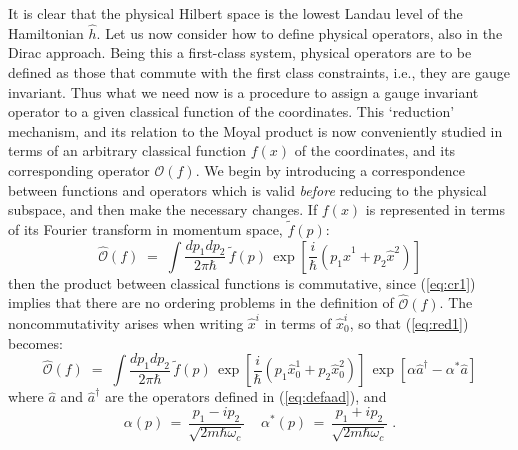 \documentclass[a4paper,12pt]{article}
\begin{document}
It is clear that the physical Hilbert space is the lowest Landau
level
of the Hamiltonian ${\hat h}$. Let us now consider how to define
physical operators, also in the Dirac approach. Being this a
first-class system, physical operators are to be defined as those
that
commute with the first class constraints, i.e., they are gauge
invariant. Thus what we need now is a procedure to assign a gauge
invariant operator to a given classical function of the
coordinates.
This `reduction' mechanism, and its relation to the Moyal product
is
now conveniently studied in terms of an arbitrary classical
function
$f(x)$ of the coordinates, and its corresponding operator
${\mathcal
  O}(f)$.  We begin by introducing a correspondence between
functions
and operators which is valid {\em before\/} reducing to the
physical
subspace, and then make the necessary changes. If $f(x)$ is
represented in terms of its Fourier transform in momentum space,
${\tilde f}(p)$:
\begin{equation}
  \label{eq:red1}
{\hat {\mathcal O}}(f)\;=\; \int \frac{dp_1 dp_2}{2\pi \hbar}\,
{\tilde f}(p) \, \exp [ \frac{i}{\hbar} (p_1 {\hat x}^1 + p_2 {\hat
x}^2)]
\end{equation}
then the product between classical functions is commutative, since
(\ref{eq:cr1}) implies that there are no ordering problems in the
definition of ${\hat{\mathcal O}}(f)$.  The noncommutativity arises
when writing ${\hat x}^i$ in terms of ${\hat x}^i_0$, so that
(\ref{eq:red1}) becomes:
\begin{equation}
  \label{eq:red2}
{\hat {\mathcal O}}(f)\;=\; \int \frac{dp_1 dp_2}{2\pi \hbar}\,
{\tilde f}(p) \, \exp [ \frac{i}{\hbar} (p_1 {\hat x}^1_0 + p_2
{\hat x}^2_0)]
\, \exp [ \alpha {\hat a}^\dagger - \alpha^* {\hat a} ]
\end{equation}
where ${\hat a}$ and ${\hat a}^\dagger$ are the operators defined
in
(\ref{eq:defaad}), and
\begin{equation}
  \label{eq:red3}
\alpha(p) \,=\,\frac{p_1 - i p_2}{\sqrt{2 m \hbar \omega_c}}
\;\;\;\;
\alpha^*(p) \,=\,\frac{p_1 + i p_2}{\sqrt{2 m \hbar \omega_c}} \;.
\end{equation}
\end{document}
